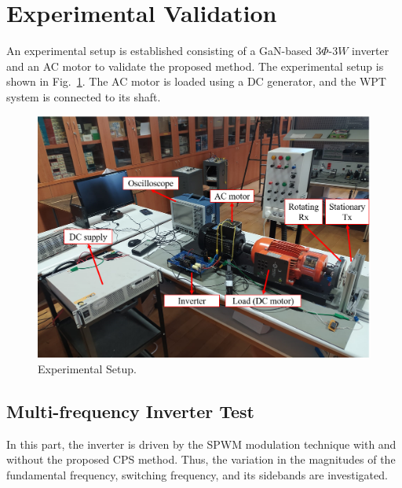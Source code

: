 \documentclass[journal]{IEEEtran}
\begin{document}
\section{Experimental Validation}
An experimental setup is established consisting of a GaN-based $3\Phi$-$3W$ inverter and an AC motor to validate the proposed method. The experimental setup is shown in Fig.~\ref{fig:exp_setup}. The AC motor is loaded using a DC generator, and the WPT system is connected to its shaft.
\begin{figure}[h!]
    \centering
    \includegraphics[width=0.8\linewidth]{setup2.png}
    \caption{Experimental Setup.}
    \label{fig:exp_setup}
\end{figure}
\vspace*{-5mm}
\subsection{Multi-frequency Inverter Test}
In this part, the inverter is driven by the SPWM modulation technique with and without the proposed CPS method.
Thus, the variation in the magnitudes of the fundamental frequency, switching frequency, and its sidebands are investigated.
\end{document}
